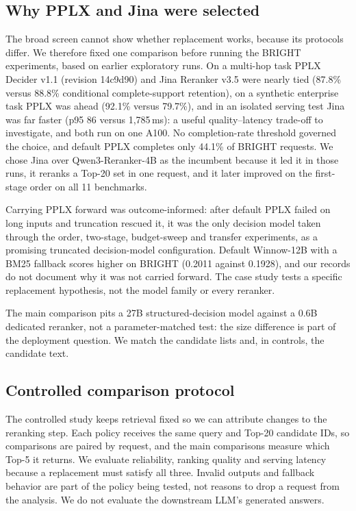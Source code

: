\documentclass[conference]{IEEEtran}
\begin{document}
{\subsection{Why PPLX and Jina were selected}\label{sec:setup}
The broad screen cannot show whether replacement works, because its protocols differ. We therefore fixed one comparison before running the BRIGHT experiments, based on earlier exploratory runs. On a multi-hop task PPLX Decider v1.1 (revision 14c9d90) and Jina Reranker v3.5 were nearly tied (87.8\% versus 88.8\% conditional complete-support retention), on a synthetic enterprise task PPLX was ahead (92.1\% versus 79.7\%), and in an isolated serving test Jina was far faster (p95 86 versus 1,785\,ms): a useful quality--latency trade-off to investigate, and both run on one A100. No completion-rate threshold governed the choice, and default PPLX completes only 44.1\% of BRIGHT requests. We chose Jina over Qwen3-Reranker-4B as the incumbent because it led it in those runs, it reranks a Top-20 set in one request, and it later improved on the first-stage order on all 11 benchmarks.

Carrying PPLX forward was outcome-informed: after default PPLX failed on long inputs and truncation rescued it, it was the only decision model taken through the order, two-stage, budget-sweep and transfer experiments, as a promising truncated decision-model configuration. Default Winnow-12B with a BM25 fallback scores higher on BRIGHT (0.2011 against 0.1928), and our records do not document why it was not carried forward. The case study tests a specific replacement hypothesis, not the model family or every reranker.

The main comparison pits a 27B structured-decision model against a 0.6B dedicated reranker, not a parameter-matched test: the size difference is part of the deployment question. We match the candidate lists and, in controls, the candidate text.

\subsection{Controlled comparison protocol}\label{sec:success}
The controlled study keeps retrieval fixed so we can attribute changes to the reranking step. Each policy receives the same query and Top-20 candidate IDs, so comparisons are paired by request, and the main comparisons measure which Top-5 it returns. We evaluate reliability, ranking quality and serving latency because a replacement must satisfy all three. Invalid outputs and fallback behavior are part of the policy being tested, not reasons to drop a request from the analysis. We do not evaluate the downstream LLM's generated answers.

}
\end{document}
